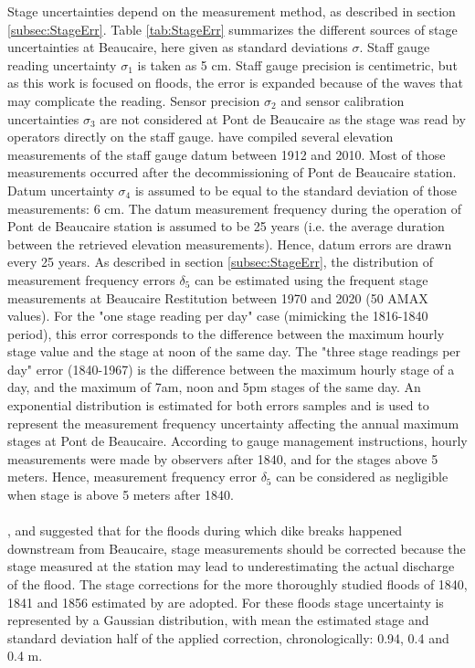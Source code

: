     Stage uncertainties depend on the measurement method, as described in section \ref{subsec:StageErr}. Table \ref{tab:StageErr} summarizes the different sources of stage uncertainties at Beaucaire, here given as standard deviations $\sigma$. Staff gauge reading uncertainty $\sigma_1$ is taken as 5 cm. Staff gauge precision is centimetric, but as this work is focused on floods, the error is expanded because of the waves that may complicate the reading. 
    Sensor precision $\sigma_2$ and sensor calibration uncertainties $\sigma_3$ are not considered at Pont de Beaucaire as the stage was read by operators directly on the staff gauge. 
    \citet{bard_actualisation_2018} have compiled several elevation measurements of the staff gauge datum between 1912 and 2010. Most of those measurements occurred after the decommissioning of Pont de Beaucaire station. Datum uncertainty $\sigma_4$ is assumed to be equal to the standard deviation of those measurements: 6 cm. The datum measurement frequency during the operation of Pont de Beaucaire station is assumed to be 25 years (i.e. the average duration between the retrieved elevation measurements). Hence, datum errors are drawn every 25 years. 
    As described in section \ref{subsec:StageErr}, the distribution of measurement frequency errors $\delta_5$ can be estimated using the frequent stage measurements at Beaucaire Restitution between 1970 and 2020 (50 AMAX values). For the "one stage reading per day" case (mimicking the 1816-1840 period), this error corresponds to the difference between the maximum hourly stage value and the stage at noon of the same day. The "three stage readings per day" error (1840-1967) is the difference between the maximum hourly stage of a day, and the maximum of 7am, noon and 5pm stages of the same day. An exponential distribution is estimated for both errors samples and is used to represent the measurement frequency uncertainty affecting the annual maximum stages at Pont de Beaucaire. According to gauge management instructions, hourly measurements were made by observers after 1840, and for the stages above 5 meters. Hence, measurement frequency error $\delta_5$ can be considered as negligible when stage is above 5 meters after 1840.
    \paragraph{}
    \citet{symadrem_programme_2012}, \citet{pichard_hauteurs_2013} and \citet{bard_actualisation_2018} suggested that for the floods during which dike breaks happened downstream from Beaucaire, stage measurements should be corrected because the stage measured at the station may lead to underestimating the actual discharge of the flood. The stage corrections for the more thoroughly studied floods of 1840, 1841 and 1856 estimated by \citet{symadrem_programme_2012} are adopted. For these floods stage uncertainty is represented by a Gaussian distribution, with mean the estimated stage and standard deviation half of the applied correction, chronologically: 0.94, 0.4 and 0.4 m. 
    \FloatBarrier
 
